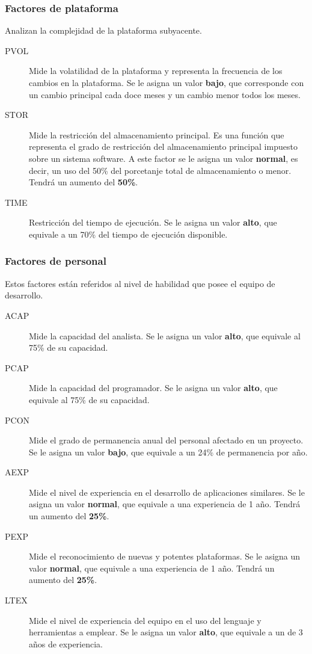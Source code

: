 \documentclass[11pt,a4paper,spanish,twoside]{book}
\begin{document}
\subsubsection{Factores de plataforma}
Analizan la complejidad de la plataforma subyacente.
\begin{description}
\item[PVOL] Mide la volatilidad de la plataforma y representa la frecuencia de
  los cambios en la plataforma. Se le asigna un valor \textbf{bajo}, que
  corresponde con un cambio principal cada doce meses y un cambio menor todos
  los meses.

\item[STOR] Mide la restricción del almacenamiento principal. Es una función
  que representa el grado de restricción del almacenamiento principal
  impuesto sobre un sistema software. A este factor se le asigna un valor
  \textbf{normal}, es decir, un uso del 50\% del porcetanje total de
  almacenamiento o menor. Tendrá un aumento del \textbf{50\%}.

\item[TIME] Restricción del tiempo de ejecución. Se le asigna un valor
  \textbf{alto}, que equivale a un 70\% del tiempo de ejecución disponible.
\end{description}

\subsubsection{Factores de personal}
Estos factores están referidos al nivel de habilidad que posee el equipo de
desarrollo.
\begin{description}
\item[ACAP] Mide la capacidad del analista. Se le asigna un valor
\textbf{alto}, que equivale al 75\% de su capacidad.
\item[PCAP] Mide la capacidad del programador. Se le asigna un valor
\textbf{alto}, que equivale al 75\% de su capacidad.
\item[PCON] Mide el grado de permanencia anual del personal afectado en un
proyecto. Se le asigna un valor \textbf{bajo}, que equivale a un 24\% de
permanencia por año.
\item[AEXP] Mide el nivel de experiencia en el desarrollo de aplicaciones
similares. Se le asigna un valor \textbf{normal}, que equivale a una
experiencia de 1 año. Tendrá un aumento del \textbf{25\%}.
\item[PEXP] Mide el reconocimiento de nuevas y potentes plataformas. Se le
asigna un valor \textbf{normal}, que equivale a una experiencia de 1
año. Tendrá un aumento del \textbf{25\%}. 
\item[LTEX] Mide el nivel de experiencia del equipo en el uso del lenguaje y
herramientas a emplear. Se le asigna un valor \textbf{alto}, que
equivale a un de 3 años de experiencia.
\end{description}
\end{document}
